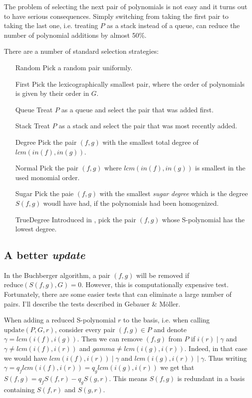 \documentclass{article}
\theoremstyle{changedot}
\theoremstyle{changedotbreak}
\theoremstyle{nonumberplain}
\begin{document}
The problem of selecting the next pair of polynomials is not easy and it turns out to have serious consequences. Simply switching from taking the first pair to taking the last one, i.e. treating $P$ as a stack instead of a queue, can reduce the number of polynomial additions by almost 50\%.

There are a number of standard selection strategies:

\begin{itemize}
  \item[Random] Pick a random pair uniformly.

  \item[First] Pick the lexicographically smallest pair, where the order of polynomials is given by their order in $G$. 

  \item[Queue] Treat $P$ as a queue and select the pair that was added first.

  \item[Stack] Treat $P$ as a stack and select the pair that was most recently added.

  \item[Degree] Pick the pair $(f, g)$ with the smallest total degree of $lcm(in(f), in(g))$.

  \item[Normal] Pick the pair $(f, g)$ where $lcm(in(f), in(g))$ is smallest in the used monomial order.

  \item[Sugar] Pick the paie $(f, g)$ with the smallest \emph{sugar degree} which is the degree $S(f, g)$ woudl have had, if the polynomials had been homogenized.

  \item[TrueDegree] Introduced in \cite{peifer}, pick the pair $(f, g)$ whose S-polynomial has the lowest degree.
\end{itemize}


\subsection{A better \emph{update}}  \label{sec:update}
In the Buchberger algorithm, a pair $(f, g)$ will be removed if $\text{reduce}(S(f, g), G) = 0$. However, this is computationally expensive test. Fortunately, there are some easier tests that can eliminate a large number of pairs. I'll describe the tests described in Gebauer \& Möller.

When adding a reduced S-polynomial $r$ to the basis, i.e. when calling $\text{update}(P, G, r)$, consider every pair $(f, g) \in P$ and denote $\gamma = lcm(i(f), i(g))$. Then we can remove $(f, g)$ from $P$ if $i(r) \mid \gamma$ and $\gamma \neq lcm(i(f), i(r))$ and $gamma \neq lcm(i(g), i(r))$. Indeed, in that case we would have $lcm(i(f), i(r)) \mid \gamma$ and $lcm(i(g), i(r)) \mid \gamma$. Thus writing $\gamma = q_{f} lcm(i(f), i(r)) = q_{g} lcm(i(g), i(r))$ we get that $S(f, g) = q_{f}S(f, r) - q_{g} S(g, r)$. This means $S(f, g)$ is redundant in a basis containing $S(f, r)$ and $S(g, r)$.
\end{document}
